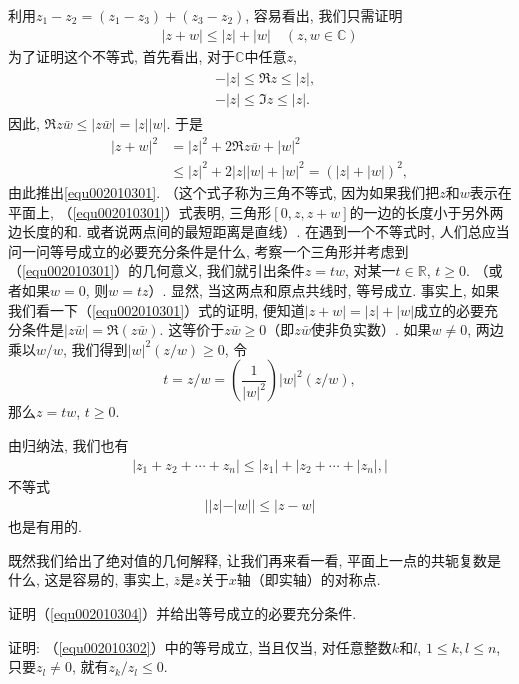 利用$z_1-z_2 = (z_1-z_3) + (z_3-z_2)$, 容易看出, 我们只需证明
\begin{gather}\label{equ002010301}
|z+w| \le |z| + |w| \quad (z, w \in \mathbb{C})
\end{gather}
为了证明这个不等式, 首先看出, 对于$\mathbb{C}$中任意$z$, 
\begin{gather}\label{equ002010302}
\begin{aligned}
&-|z| \le \Re{z} \le |z|, \\
&-|z| \le \Im{z} \le |z|.
\end{aligned}
\end{gather}
因此, $\Re{z\bar{w}} \le |z\bar{w}| = |z||w|$. 于是
\[
\begin{aligned}
|z+w|^2 &= |z|^2 + 2\Re{z\bar{w}} + |w|^2\\
&\le |z|^2 + 2|z||w| + |w|^2 = (|z|+|w|)^2,
\end{aligned}
\]
由此推出\ref{equ002010301}. （这个式子称为三角不等式, 因为如果我们把$z$和$w$表示在平面上, （\ref{equ002010301}）式表明, 三角形$[0,z,z+w]$的一边的长度小于另外两边长度的和. 或者说两点间的最短距离是直线）. 在遇到一个不等式时, 人们总应当问一问等号成立的必要充分条件是什么, 考察一个三角形并考虑到（\ref{equ002010301}）的几何意义, 我们就引出条件$z=tw$, 对某一$t \in \mathbb{R}$, $t \ge 0$. （或者如果$w=0$, 则$w=tz$）. 显然, 当这两点和原点共线时, 等号成立. 事实上, 如果我们看一下（\ref{equ002010301}）式的证明, 便知道$|z+w|=|z|+|w|$成立的必要充分条件是$|z\bar{w}|=\Re(z\bar{w})$. 这等价于$z\bar{w}\ge 0$（即$z\bar{w}$使非负实数）. 如果$w \neq 0$, 两边乘以$w/w$, 我们得到$|w|^2(z/w) \ge 0$, 令
\[
t = z/w = (\frac{1}{|w|^2})|w|^2(z/w),
\]
那么$z=tw$, $t \ge 0$. 

由归纳法, 我们也有
\begin{gather}\label{equ002010303}
|z_1+z_2+\cdots+z_n| \le |z_1|+|z_2+\cdots+|z_n|,|
\end{gather}
不等式
\begin{gather}\label{equ002010304}
||z| - |w|| \le |z-w|
\end{gather}
也是有用的. 

既然我们给出了绝对值的几何解释, 让我们再来看一看, 平面上一点的共轭复数是什么, 这是容易的, 事实上, $\bar{z}$是$z$关于$x$轴（即实轴）的对称点. 

\begin{exercise}
证明（\ref{equ002010304}）并给出等号成立的必要充分条件. 
\end{exercise}

\begin{exercise}
证明: （\ref{equ002010302}）中的等号成立, 当且仅当, 对任意整数$k$和$l$, $1 \le k,l \le n$, 只要$z_l \neq 0$, 就有$z_k/z_l \le 0$. 
\end{exercise}

